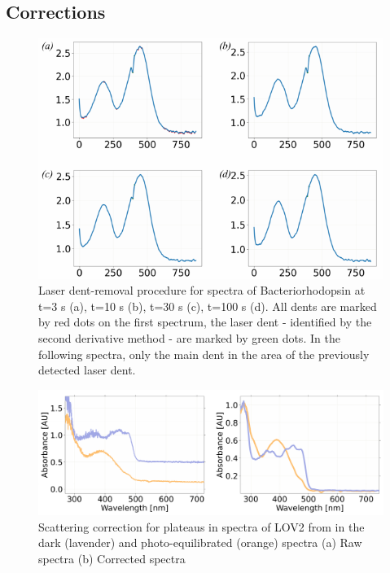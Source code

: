 \subsection{Corrections}

\begin{figure}[H] %
    \centering
    \noindent \includegraphics[width=\textwidth]{images/Spectroscopy/icOS_toolbox_FigS3.pdf}
    \hfill
    \caption{Laser dent-removal procedure for spectra of Bacteriorhodopsin at t=3 \textmu s (a), t=10 \textmu s (b), t=30 \textmu s (c), t=100 \textmu s (d). All dents are marked by red dots on the first spectrum, the laser dent - identified by the second derivative method - are marked by green dots. In the following spectra, only the main dent in the area of the previously detected laser dent. }
    \label{supfig:laserdent}
\end{figure}

\begin{figure}[H] %
    \centering
    \noindent \includegraphics[width=\textwidth]{images/Spectroscopy/icOS_toolbox_Fig.S4.pdf}
    \hfill
    \caption{Scattering correction for plateaus in spectra of LOV2 from \cite{aumonierSlowProteinDynamics2022} in the dark (lavender) and photo-equilibrated (orange) spectra (a) Raw spectra (b) Corrected spectra}
    \label{supfig:plateau_correction}
\end{figure}

